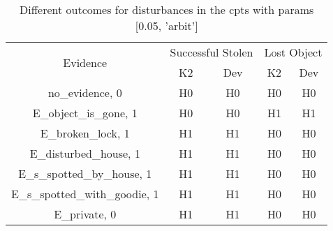 \begin{table}\begin{tabular}{c|cc|cc}\toprule\multirow{2}{*}{Evidence} & \multicolumn{2}{c}{Successful Stolen} & \multicolumn{2}{c}{Lost Object} \\& {K2} & {Dev} & {K2} & {Dev} \\\midrule
no\_evidence, 0 & H0&H0&H0&H0\\E\_object\_is\_gone, 1 & H0&H0&H1&H1\\E\_broken\_lock, 1 & H1&H1&H0&H0\\E\_disturbed\_house, 1 & H1&H1&H0&H0\\E\_s\_spotted\_by\_house, 1 & H1&H1&H0&H0\\E\_s\_spotted\_with\_goodie, 1 & H1&H1&H0&H0\\E\_private, 0 & H1&H1&H0&H0\\\bottomrule\end{tabular}\caption{Different outcomes for disturbances in the cpts with params [0.05, 'arbit']}\end{table}